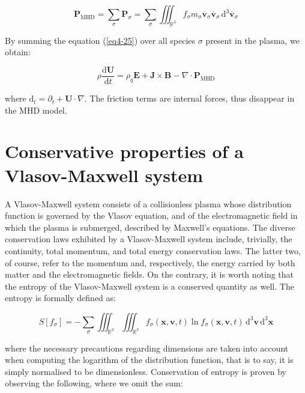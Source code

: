 \begin{equation}
    \mathbf{P}_\text{MHD}=\sum_{\sigma}\mathbf{P}_\sigma=\sum_{\sigma}\iiint_{\mathbb{R}^3}f_\sigma m_\sigma\overline{\mathbf{v}}_\sigma\overline{\mathbf{v}}_\sigma\,\mathrm{d}^3\overline{\mathbf{v}}_\sigma
\end{equation}

By summing the equation (\ref{eq4-25}) over all species $\sigma$ present in the plasma, we obtain:

\begin{equation}
    \label{eq-3-46}
    \rho\frac{\mathrm{d}\mathbf{U}}{\mathrm{d}t}=\rho_q\mathbf{E}+\mathbf{J}\times\mathbf{B}-\nabla\cdot\mathbf{P}_\text{MHD}
\end{equation}

where $\mathrm{d}_t=\partial_t+\mathbf{U}\cdot\nabla$. The friction terms are internal forces, thus disappear in the MHD model.

\section{Conservative properties of a Vlasov-Maxwell system}

\label{vlasov-maxwell}

A Vlasov-Maxwell system consists of a collisionless plasma whose distribution function is governed by the Vlasov equation, and of the electromagnetic field in which the plasma is submerged, described by Maxwell's equations. The diverse conservation laws exhibited by a Vlasov-Maxwell system include, trivially, the continuity, total momentum, and total energy conservation laws. The latter two, of course, refer to the momentum and, respectively, the energy carried by both matter and the electromagnetic fields. On the contrary, it is worth noting that the entropy of the Vlasov-Maxwell system is a conserved quantity as well. The entropy is formally defined as:

\begin{equation}
    S[f_\sigma]=-\sum_{\sigma}\iiint_{\mathbb{R}^3}\iiint_{\mathbb{R}^3}f_\sigma(\mathbf{x},\mathbf{v},t)\ln{f_\sigma(\mathbf{x},\mathbf{v},t)}\,\mathrm{d}^3\mathbf{v}\,\mathrm{d}^3\mathbf{x}
\end{equation}

where the necessary precautions regarding dimensions are taken into account when computing the logarithm of the distribution function, that is to say, it is simply normalised to be dimensionless. Conservation of entropy is proven by observing the following, where we omit the sum:


